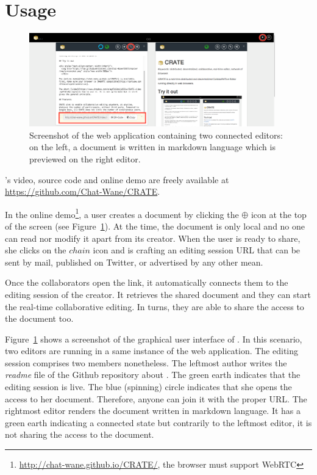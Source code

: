
\section{Usage}
\label{sec:usage}

\begin{figure}
  \centering
  \includegraphics[width=0.95\textwidth]{./img/crate.png}
  \caption{\label{img:screenshot} Screenshot of the web application containing
    two connected editors: on the left, a document is written in markdown
    language which is previewed on the right editor.}
\end{figure}

\CRATE's video, source code and online demo are freely available at
\url{https://github.com/Chat-Wane/CRATE}.

In the online demo\footnote{\url{http://chat-wane.github.io/CRATE/}, the browser
  must support WebRTC}, a user creates a document by clicking the $\oplus$ icon
at the top of the screen (see Figure~\ref{img:screenshot}). At the time, the
document is only local and no one can read nor modify it apart from its
creator. When the user is ready to share, she clicks on the $chain$ icon and
\CRATE is crafting an editing session URL that can be sent by mail, published on
Twitter, or advertised by any other mean.

Once the collaborators open the link, it automatically connects them to the
editing session of the creator. It retrieves the shared document and they can
start the real-time collaborative editing. In turns, they are able to share the
access to the document too.

Figure~\ref{img:screenshot} shows a screenshot of the graphical user interface
of \CRATE. In this scenario, two editors are running in a same instance of the
web application. The editing session comprises two members nonetheless. The
leftmost author writes the \emph{readme} file of the Github repository about
\CRATE. The green earth indicates that the editing session is live. The blue
(spinning) circle indicates that she opens the access to her
document. Therefore, anyone can join it with the proper URL. The rightmost
editor renders the document written in markdown language. It has a green earth
indicating a connected state but contrarily to the leftmost editor, it is not
sharing the access to the document.

